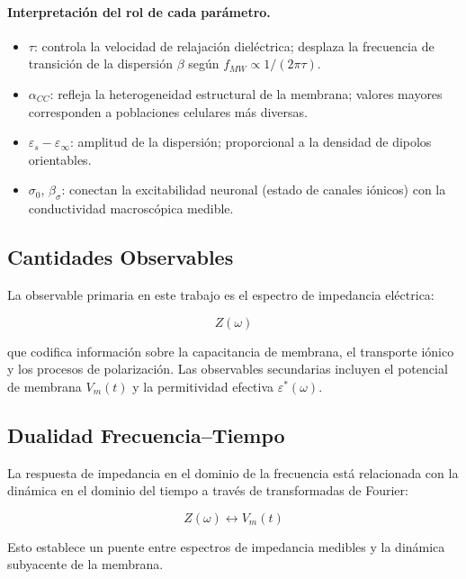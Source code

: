 \documentclass[12pt]{article}
\begin{document}
\paragraph{Interpretaci\'on del rol de cada par\'ametro.}

\begin{itemize}
\item $\tau$: controla la velocidad de relajaci\'on diel\'ectrica; desplaza la frecuencia de
transici\'on de la dispersi\'on $\beta$ seg\'un $f_{MW} \propto 1/(2\pi\tau)$.
\item $\alpha_{CC}$: refleja la heterogeneidad estructural de la membrana; valores mayores
corresponden a poblaciones celulares m\'as diversas.
\item $\varepsilon_s - \varepsilon_\infty$: amplitud de la dispersi\'on; proporcional a la
densidad de dipolos orientables.
\item $\sigma_0$, $\beta_\sigma$: conectan la excitabilidad neuronal (estado de canales
i\'onicos) con la conductividad macrosc\'opica medible.
\end{itemize}

\subsection{Cantidades Observables}
La observable primaria en este trabajo es el espectro de impedancia el\'ectrica:

\begin{equation}
Z(\omega)
\end{equation}

que codifica informaci\'on sobre la capacitancia de membrana, el transporte i\'onico y los
procesos de polarizaci\'on. Las observables secundarias incluyen el potencial de membrana
$V_m(t)$ y la permitividad efectiva $\varepsilon^*(\omega)$.

\subsection{Dualidad Frecuencia--Tiempo}

La respuesta de impedancia en el dominio de la frecuencia est\'a relacionada con la din\'amica
en el dominio del tiempo a trav\'es de transformadas de Fourier:

\begin{equation}
Z(\omega) \longleftrightarrow V_m(t)
\end{equation}

Esto establece un puente entre espectros de impedancia medibles y la din\'amica subyacente
de la membrana.
\end{document}
